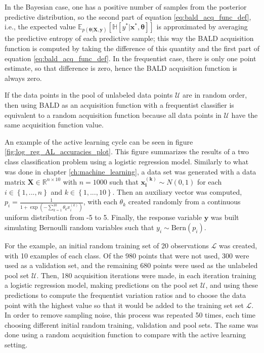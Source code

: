 In the Bayesian case, one has a positive number of samples from the posterior predictive distribution, so the second part of equation \eqref{eq:bald_acq_func_def}, i.e., the expected value
$\mathbb{E}_{p(\boldsymbol{\theta} | \boldsymbol{X}, \boldsymbol{y})} \left[ \mathbb{H} \left[ y^* | \boldsymbol{x}^*, \boldsymbol{\theta} \right] \right]$
is approximated by averaging the predictive entropy of each predictive sample; this way the BALD acquisition function is computed by taking the difference of this quantity and the first part of equation \eqref{eq:bald_acq_func_def}.
In the frequentist case, there is only one point estimate, so that difference is zero, hence the BALD acquisition function is always zero.

If the data points in the pool of unlabeled data points $\mathcal{U}$ are in random order, then using BALD as an acquisition function with a frequentist classifier is equivalent to a random acquisition function because all data points in $\mathcal{U}$ have the same acquisition function value.

An example of the active learning cycle can be seen in figure \ref{fig:log_reg_AL_accuracies_plot}. This figure summarizes the results of a two class classification problem using a logistic regression model. Similarly to what was done in chapter \ref{ch:machine_learning}, a data set was generated with a data matrix $\boldsymbol{X} \in \mathbb{R}^{n \times 10}$ with $n = 1000$ such that $\boldsymbol{x_i^{(k)}} \sim N(0, 1)$ for each $i \in \left\{1, ..., n \right\}$ and $k \in \left\{1, ..., 10 \right\}$.
Then an auxiliary vector was computed, $p_i = \frac{1}{1 + \exp \left( - \sum_{k = 1}^{10} \theta_k x_i^{(k)}  \right)}$, with each $\theta_k$ created randomly from a continuous uniform distribution from -5 to 5. Finally, the response variable $\boldsymbol{y}$ was built simulating Bernoulli random variables such that $y_i \sim \mathrm{Bern}(p_i)$.

For the example, an initial random training set of 20 observations $\mathcal{L}$ was created, with 10 examples of each class. Of the 980 points that were not used, 300 were used as a validation set, and the remaining 680 points were used as the unlabeled pool set $\mathcal{U}$.
Then, 180 acquisition iterations were made, in each iteration training a logistic regression model, making predictions on the pool set $\mathcal{U}$, and using these predictions to compute the frequentist variation ratios and to choose the data point with the highest value so that it would be added to the training set set $\mathcal{L}$. In order to remove sampling noise, this process was repeated 50 times, each time choosing different initial random training, validation and pool sets. The same was done using a random acquisition function to compare with the active learning setting.

